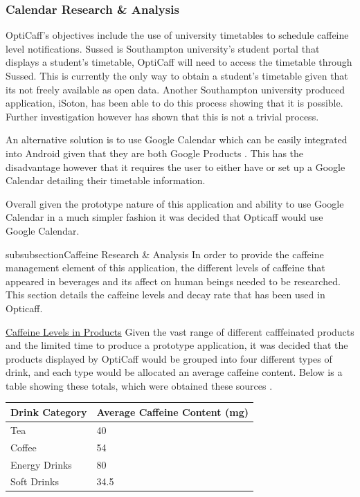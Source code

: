 \subsubsection{Calendar Research \& Analysis}
\label{sec:calendar}
OptiCaff’s objectives include the use of university timetables to schedule caffeine level notifications. 
Sussed is Southampton university’s student portal that displays a student’s timetable, OptiCaff will need to access the timetable through Sussed. 
This is currently the only way to obtain a student's timetable given that its not freely available as open data. 
Another Southampton university produced application, iSoton, has been able to do this process showing that it is possible.
Further investigation however has shown that this is not a trivial process.

An alternative solution is to use Google Calendar which can be easily integrated into Android given that they are both Google Products \cite{calendar}.
This has the disadvantage however that it requires the user to either have or set up a Google Calendar detailing their timetable information. 
 
Overall given the prototype nature of this application and ability to use Google Calendar in a much simpler fashion it was decided that Opticaff would use Google Calendar. 

subsubsection{Caffeine Research \& Analysis}
\label{sec:Caffeine}
In order to provide the caffeine management element of this application, the different levels of caffeine that appeared in beverages and its affect on human beings needed to be researched. This section details the caffeine levels and decay rate that has been used in Opticaff. 

\underline{Caffeine Levels in Products} \newline
Given the vast range of different cafffeinated products and the limited time to produce a prototype application, it was decided that the products displayed by OptiCaff would be grouped into four different types of drink, and each type would be allocated an average caffeine content. Below is a table showing these totals, which were obtained these sources \cite{Coke} \cite{TeaCoffee} \cite{EnergyDrink}.

\begin{center}
\begin{tabular}{|l|l|}
\hline
\textbf{Drink Category} & \textbf{Average Caffeine Content (mg)} \\\hline
Tea & 40 \\\hline
Coffee & 54 \\\hline
Energy Drinks & 80 \\\hline
Soft Drinks & 34.5 \\\hline
\end{tabular}
\end{center}

